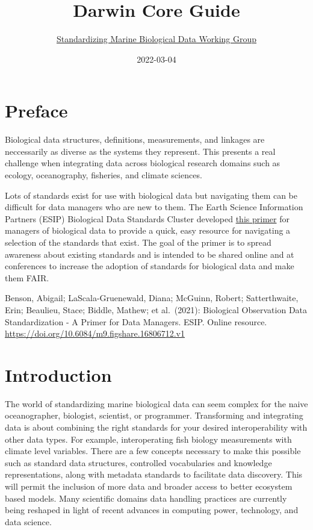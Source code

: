\documentclass[
]{book}
\title{Darwin Core Guide}
\author{\href{https://github.com/ioos/bio_data_guide/graphs/contributors}{Standardizing Marine Biological Data Working Group}}
\date{2022-03-04}
\begin{document}
\maketitle

{
\setcounter{tocdepth}{1}
\tableofcontents
}
\hypertarget{preface}{%
\chapter*{Preface}\label{preface}}

Biological data structures, definitions, measurements, and linkages are neccessarily as diverse as the systems they represent. This presents a real challenge when integrating data across biological research domains such as ecology, oceanography, fisheries, and climate sciences.

Lots of standards exist for use with biological data but navigating them can be difficult for data managers who are new to them. The Earth Science Information Partners (ESIP) Biological Data Standards Cluster developed \href{https://doi.org/10.6084/m9.figshare.16806712.v1}{this primer} for managers of biological data to provide a quick, easy resource for navigating a selection of the standards that exist. The goal of the primer is to spread awareness about existing standards and is intended to be shared online and at conferences to increase the adoption of standards for biological data and make them FAIR.

Benson, Abigail; LaScala-Gruenewald, Diana; McGuinn, Robert; Satterthwaite, Erin; Beaulieu, Stace; Biddle, Mathew; et al.~(2021): Biological Observation Data Standardization - A Primer for Data Managers. ESIP. Online resource. \url{https://doi.org/10.6084/m9.figshare.16806712.v1}

\hypertarget{intro}{%
\chapter{Introduction}\label{intro}}

The world of standardizing marine biological data can seem complex for the naive oceanographer, biologist, scientist, or programmer.
Transforming and integrating data is about combining the right standards for your desired interoperability with other data types.
For example, interoperating fish biology measurements with climate level variables.
There are a few concepts necessary to make this possible such as standard data structures, controlled vocabularies and knowledge representations, along with metadata standards to facilitate data discovery. This will permit the inclusion of more data and broader access to better ecosystem based models. Many scientific domains data handling practices are currently being reshaped in light of recent advances in computing power, technology, and data science.
\end{document}
